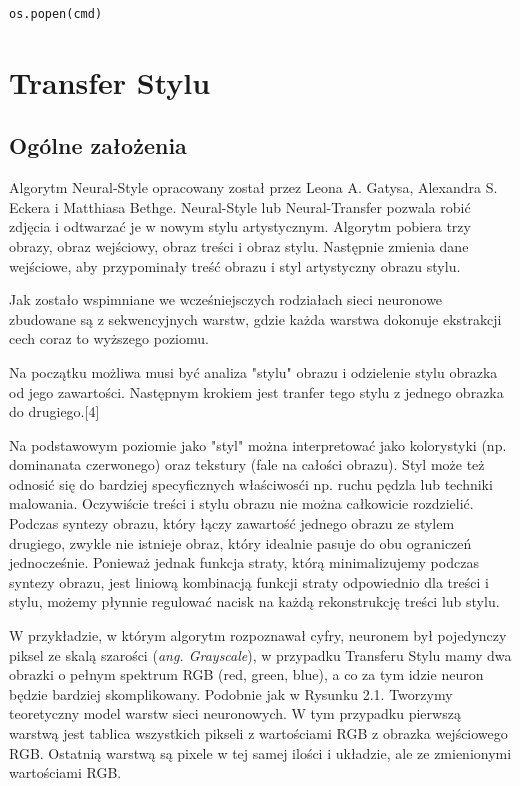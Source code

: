 \documentclass[brudnopis]{xmgr}
\begin{document}
\begin{lstlisting}
os.popen(cmd)
\end{lstlisting}



\chapter{Transfer Stylu }

\section{Ogólne założenia\label{s:dsssl}}

Algorytm Neural-Style opracowany został przez Leona A. Gatysa, Alexandra S. Eckera i Matthiasa Bethge. Neural-Style lub Neural-Transfer pozwala robić zdjęcia i odtwarzać je w nowym stylu artystycznym. Algorytm pobiera trzy obrazy, obraz wejściowy, obraz treści i obraz stylu. Następnie zmienia dane wejściowe, aby przypominały treść obrazu i styl artystyczny obrazu stylu.

Jak zostało wspimniane we wcześniejsczych rodziałach sieci neuronowe zbudowane są z sekwencyjnych warstw, gdzie każda warstwa dokonuje ekstrakcji cech coraz to wyższego poziomu.

Na początku możliwa musi być analiza "stylu" obrazu i odzielenie stylu obrazka od jego zawartości. 
Następnym krokiem jest tranfer tego stylu z jednego obrazka do drugiego.[4]

Na podstawowym poziomie jako "styl" można interpretować jako  kolorystyki (np. dominanata czerwonego) oraz tekstury (fale na całości obrazu).
Styl może też odnosić się do bardziej specyficznych właściwosći np. ruchu pędzla lub techniki malowania. Oczywiście treści i stylu obrazu nie można całkowicie rozdzielić. Podczas syntezy obrazu, który łączy zawartość jednego obrazu ze stylem drugiego, zwykle nie istnieje obraz, który idealnie pasuje do obu ograniczeń jednocześnie. Ponieważ jednak funkcja straty, którą minimalizujemy podczas syntezy obrazu, jest liniową kombinacją funkcji straty odpowiednio dla treści i stylu, możemy płynnie regulować nacisk na każdą rekonstrukcję treści lub stylu.

W przykładzie, w którym algorytm rozpoznawał cyfry, neuronem był pojedynczy piksel ze skalą szarości (\textit{ang. Grayscale}), w przypadku Transferu Stylu mamy dwa obrazki o pełnym  spektrum RGB (red, green, blue), a co za tym idzie neuron będzie bardziej skomplikowany. Podobnie jak w Rysunku 2.1. Tworzymy teoretyczny model warstw sieci neuronowych. W tym przypadku pierwszą  warstwą jest tablica wszystkich pikseli z wartościami RGB z obrazka wejściowego RGB. Ostatnią warstwą  są pixele w tej samej ilości i układzie, ale ze zmienionymi wartościami RGB. 
\end{document}
